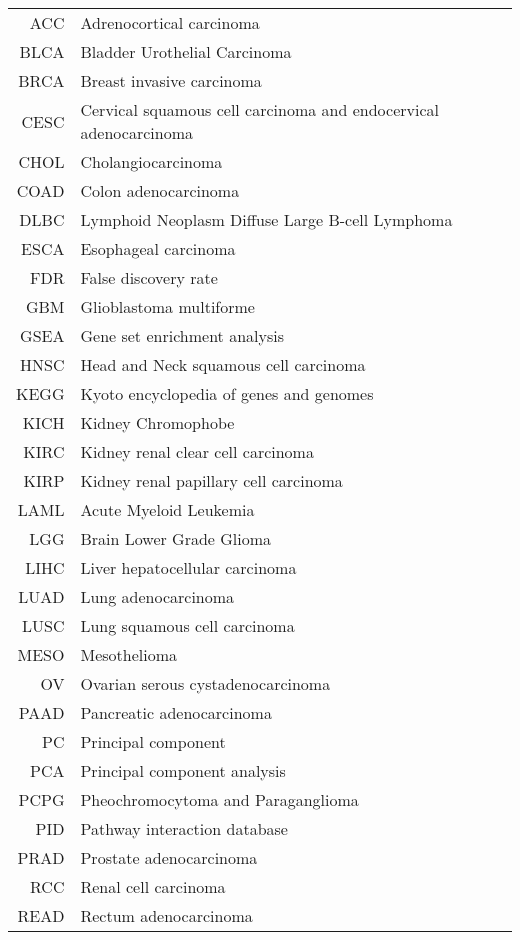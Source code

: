 \documentclass[
  parskip,
  oneside]{scrreprt}
\begin{document}
\begin{tabular}{rl}
        ACC & Adrenocortical carcinoma\\
        BLCA & Bladder Urothelial Carcinoma\\
        BRCA & Breast invasive carcinoma\\
        CESC & Cervical squamous cell carcinoma and endocervical adenocarcinoma\\
        CHOL & Cholangiocarcinoma\\
        COAD & Colon adenocarcinoma\\
      DLBC & Lymphoid Neoplasm Diffuse Large B-cell Lymphoma\\
      ESCA & Esophageal carcinoma\\
      FDR & False discovery rate\\ 
      GBM & Glioblastoma multiforme\\
      GSEA & Gene set enrichment analysis\\
      HNSC & Head and Neck squamous cell carcinoma\\
      KEGG & Kyoto encyclopedia of genes and genomes\\
      KICH & Kidney Chromophobe\\
      KIRC & Kidney renal clear cell carcinoma\\
      KIRP & Kidney renal papillary cell carcinoma\\
      LAML & Acute Myeloid Leukemia\\
      LGG    & Brain Lower Grade Glioma\\
      LIHC & Liver hepatocellular carcinoma\\
      LUAD & Lung adenocarcinoma\\
      LUSC & Lung squamous cell carcinoma\\
      MESO & Mesothelioma\\
      OV & Ovarian serous cystadenocarcinoma\\
      PAAD & Pancreatic adenocarcinoma\\
      PC & Principal component\\
      PCA & Principal component analysis\\
      PCPG & Pheochromocytoma and Paraganglioma\\
      PID & Pathway interaction database\\
      PRAD & Prostate adenocarcinoma\\
      RCC & Renal cell carcinoma\\
      READ & Rectum adenocarcinoma\\

\end{tabular}
\end{document}
